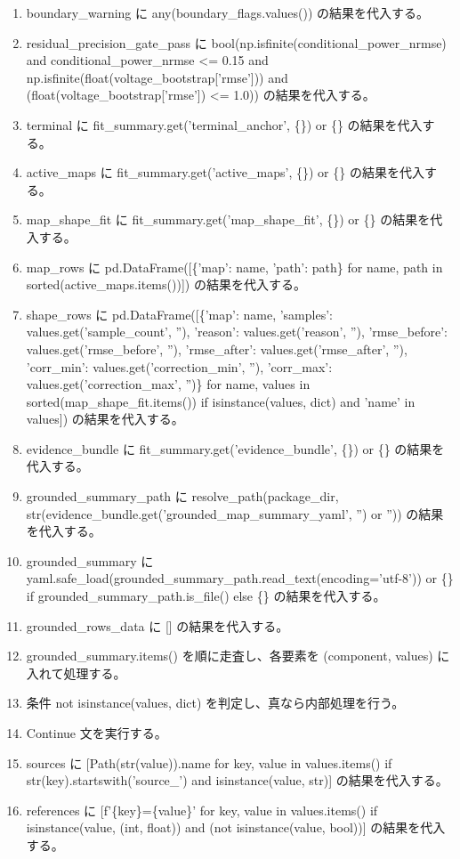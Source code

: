 \documentclass[a4paper,11pt]{article}
\begin{document}
\begin{enumerate}[leftmargin=1.8em]
\item boundary\_warning に any(boundary\_flags.values()) の結果を代入する。
\item residual\_precision\_gate\_pass に bool(np.isfinite(conditional\_power\_nrmse) and conditional\_power\_nrmse <= 0.15 and np.isfinite(float(voltage\_bootstrap['rmse'])) and (float(voltage\_bootstrap['rmse']) <= 1.0)) の結果を代入する。
\item terminal に fit\_summary.get('terminal\_anchor', \{\}) or \{\} の結果を代入する。
\item active\_maps に fit\_summary.get('active\_maps', \{\}) or \{\} の結果を代入する。
\item map\_shape\_fit に fit\_summary.get('map\_shape\_fit', \{\}) or \{\} の結果を代入する。
\item map\_rows に pd.DataFrame([\{'map': name, 'path': path\} for name, path in sorted(active\_maps.items())]) の結果を代入する。
\item shape\_rows に pd.DataFrame([\{'map': name, 'samples': values.get('sample\_count', ''), 'reason': values.get('reason', ''), 'rmse\_before': values.get('rmse\_before', ''), 'rmse\_after': values.get('rmse\_after', ''), 'corr\_min': values.get('correction\_min', ''), 'corr\_max': values.get('correction\_max', '')\} for name, values in sorted(map\_shape\_fit.items()) if isinstance(values, dict) and 'name' in values]) の結果を代入する。
\item evidence\_bundle に fit\_summary.get('evidence\_bundle', \{\}) or \{\} の結果を代入する。
\item grounded\_summary\_path に resolve\_path(package\_dir, str(evidence\_bundle.get('grounded\_map\_summary\_yaml', '') or '')) の結果を代入する。
\item grounded\_summary に yaml.safe\_load(grounded\_summary\_path.read\_text(encoding='utf-8')) or \{\} if grounded\_summary\_path.is\_file() else \{\} の結果を代入する。
\item grounded\_rows\_data に [] の結果を代入する。
\item grounded\_summary.items() を順に走査し、各要素を (component, values) に入れて処理する。
\item   条件 not isinstance(values, dict) を判定し、真なら内部処理を行う。
\item     Continue 文を実行する。
\item   sources に [Path(str(value)).name for key, value in values.items() if str(key).startswith('source\_') and isinstance(value, str)] の結果を代入する。
\item   references に [f'\{key\}=\{value\}' for key, value in values.items() if isinstance(value, (int, float)) and (not isinstance(value, bool))] の結果を代入する。

\end{enumerate}
\end{document}
